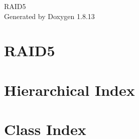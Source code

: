 \documentclass[twoside]{book}
\newcommand{\+}{\discretionary{\mbox{\scriptsize$\hookleftarrow$}}{}{}}
\newcommand{\clearemptydoublepage}{%
  \newpage{\pagestyle{empty}\cleardoublepage}%
}
\begin{document}
\hypersetup{pageanchor=false,
             bookmarksnumbered=true,
             pdfencoding=unicode
            }
\begin{titlepage}
\vspace*{7cm}
\begin{center}%
{\Large R\+A\+I\+D5 }\\
\vspace*{1cm}
{\large Generated by Doxygen 1.8.13}\\
\end{center}
\end{titlepage}
\clearemptydoublepage
{}
\tableofcontents
\clearemptydoublepage
{}
\hypersetup{pageanchor=true}

\chapter{R\+A\+I\+D5}
\label{md__c_1_cygwin64_tmp__r_a_i_d5__r_e_a_d_m_e}

\chapter{Hierarchical Index}

\chapter{Class Index}

\end{document}
